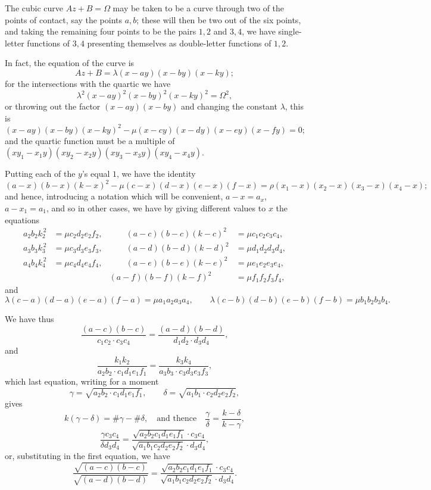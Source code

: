 \documentclass[11pt,a4paper]{book}
\begin{document}
\begin{art}
The cubic curve $Az + B = \Omega$ may be taken to be a curve through two of the points of contact, say the points $a,b$; these will then be two out of the six points, and taking the remaining four points to be the pairs $1,2$ and $3,4$, we have single-letter functions of $3,4$ presenting themselves as double-letter functions of $1,2$.

In fact, the equation of the curve is
\[
Az + B = \lambda (x-ay)(x-by)(x-ky);
\]
for the intersections with the quartic we have
\[
\lambda^2 (x-ay)^2 (x-by)^2 (x-ky)^2 = \Omega^2,
\]
or throwing out the factor $(x-ay)(x-by)$ and changing the constant $\lambda$, this is
\[
(x-ay)(x-by)(x-ky)^2 - \mu (x-cy)(x-dy)(x-ey)(x-fy) = 0;
\]
and the quartic function must be a multiple of $(xy_1-x_1y)(xy_2-x_2y)(xy_3-x_3y)(xy_4-x_4y)$.

Putting each of the $y$'s equal $1$, we have the identity
\[
(a-x)(b-x)(k-x)^2 - \mu(c-x)(d-x)(e-x)(f-x) = \rho(x_1-x)(x_2-x)(x_3-x)(x_4-x);
\]
and hence, introducing a notation which will be convenient, $a-x = a_x$, $a-x_1 = a_1$, and so in other cases, we have by giving different values to $x$ the equations
\[
\begin{aligned}
a_2b_2k_2^{\,2} &= \mu c_2d_2e_2f_2, &\qquad (a-c)(b-c)(k-c)^2 &= \mu c_1c_2c_3c_4, \\
a_3b_3k_3^{\,2} &= \mu c_3d_3e_3f_3, &\qquad (a-d)(b-d)(k-d)^2 &= \mu d_1d_2d_3d_4, \\
a_4b_4k_4^{\,2} &= \mu c_4d_4e_4f_4, &\qquad (a-e)(b-e)(k-e)^2 &= \mu e_1e_2e_3e_4, \\[-2pt]
& & (a-f)(b-f)(k-f)^2 &= \mu f_1f_2f_3f_4,
\end{aligned}
\]
and
\[
\lambda(c-a)(d-a)(e-a)(f-a) = \mu a_1a_2a_3a_4, \qquad
\lambda(c-b)(d-b)(e-b)(f-b) = \mu b_1b_2b_3b_4.
\]
\end{art}

\newpage
\begin{art}
We have thus
\[
\frac{(a-c)(b-c)}{c_1c_2 \cdot c_3c_4} = \frac{(a-d)(b-d)}{d_1d_2 \cdot d_3d_4},
\]
and
\[
\frac{k_1k_2}{a_2b_2 \cdot c_1d_1e_1f_1} = \frac{k_3k_4}{a_3b_3 \cdot c_3d_3e_3f_3},
\]
which last equation, writing for a moment
\[
\gamma = \sqrt{a_2b_2 \cdot c_1d_1e_1f_1}, \qquad
\delta = \sqrt{a_1b_1 \cdot c_2d_2e_2f_2},
\]
gives
\[
k(\gamma-\delta) = \#\gamma - \#\delta, \quad \text{and thence} \quad
\frac{\gamma}{\delta} = \frac{k-\delta}{k-\gamma},
\]
\[
\frac{\gamma c_3c_4}{\delta d_3d_4} = \frac{\sqrt{a_2b_2c_1d_1e_1f_1} \cdot c_3c_4}{\sqrt{a_1b_1c_2d_2e_2f_2} \cdot d_3d_4},
\]
or, substituting in the first equation, we have
\[
\frac{\sqrt{(a-c)(b-c)}}{\sqrt{(a-d)(b-d)}} = \frac{\sqrt{a_2b_2c_1d_1e_1f_1} \cdot c_3c_4}{\sqrt{a_1b_1c_2d_2e_2f_2} \cdot d_3d_4}.
\]
\end{art}
\end{document}
